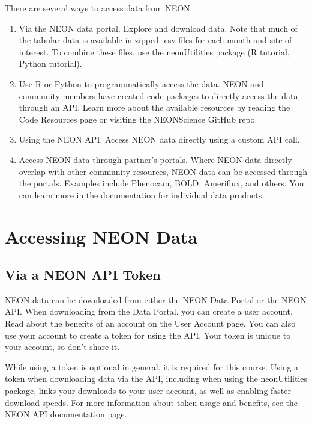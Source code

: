 \documentclass[]{book}
\providecommand{\tightlist}{%
  \setlength{\itemsep}{0pt}\setlength{\parskip}{0pt}}
\begin{document}
There are several ways to access data from NEON:

\begin{enumerate}
\def\labelenumi{\arabic{enumi}.}
\tightlist
\item
  Via the NEON data portal.
  Explore and download data. Note that much of the tabular data is available in zipped
  .csv files for each month and site of interest. To combine these files, use the
  neonUtilities package (R tutorial, Python tutorial).\\
\item
  Use R or Python to programmatically access the data. NEON and community members
  have created code packages to directly access the data through an API. Learn more
  about the available resources by reading the Code Resources page or visiting the
  NEONScience GitHub repo.\\
\item
  Using the NEON API. Access NEON data directly
  using a custom API call.
\item
  Access NEON data through partner's portals. Where NEON data directly overlap
  with other community resources, NEON data can be accessed through the portals.
  Examples include Phenocam, BOLD, Ameriflux, and others. You can learn more in the
  documentation for individual data products.
\end{enumerate}

\hypertarget{accessing-neon-data-1}{%
\section{Accessing NEON Data}\label{accessing-neon-data-1}}

\hypertarget{via-a-neon-api-token}{%
\subsection{Via a NEON API Token}\label{via-a-neon-api-token}}

NEON data can be downloaded from either the NEON Data Portal or the NEON API.
When downloading from the Data Portal, you can create a user account. Read
about the benefits of an account on the User Account page. You can also use your account to create a token for using the
API. Your token is unique to your account, so don't share it.

While using a token is optional in general, it is required for this course. Using a token when downloading data via the API,
including when using the neonUtilities package, links your downloads to
your user account, as well as enabling faster download speeds. For more
information about token usage and benefits, see the
NEON API documentation page.
\end{document}
